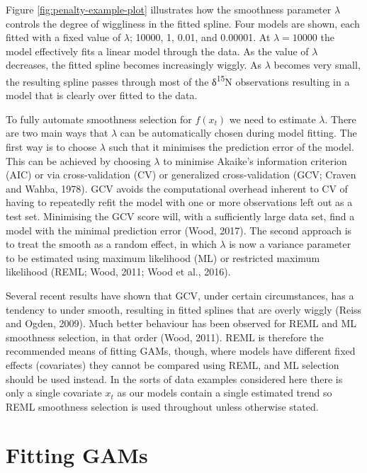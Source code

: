 \documentclass[12pt,]{article}
\begin{document}
Figure \ref{fig:penalty-example-plot} illustrates how the smoothness
parameter \(\lambda\) controls the degree of wiggliness in the fitted
spline. Four models are shown, each fitted with a fixed value of
\(\lambda\); 10000, 1, 0.01, and 0.00001. At \(\lambda = 10000\) the
model effectively fits a linear model through the data. As the value of
\(\lambda\) decreases, the fitted spline becomes increasingly wiggly. As
\(\lambda\) becomes very small, the resulting spline passes through most
of the δ\textsuperscript{15}N observations resulting in a model that is
clearly over fitted to the data.

To fully automate smoothness selection for \(f(x_t)\) we need to
estimate \(\lambda\). There are two main ways that \(\lambda\) can be
automatically chosen during model fitting. The first way is to choose
\(\lambda\) such that it minimises the prediction error of the model.
This can be achieved by choosing \(\lambda\) to minimise Akaike's
information criterion (AIC) or via cross-validation (CV) or generalized
cross-validation (GCV; Craven and Wahba, 1978). GCV avoids the
computational overhead inherent to CV of having to repeatedly refit the
model with one or more observations left out as a test set. Minimising
the GCV score will, with a sufficiently large data set, find a model
with the minimal prediction error (Wood, 2017). The second approach is
to treat the smooth as a random effect, in which \(\lambda\) is now a
variance parameter to be estimated using maximum likelihood (ML) or
restricted maximum likelihood (REML; Wood, 2011; Wood et al., 2016).

Several recent results have shown that GCV, under certain circumstances,
has a tendency to under smooth, resulting in fitted splines that are
overly wiggly (Reiss and Ogden, 2009). Much better behaviour has been
observed for REML and ML smoothness selection, in that order (Wood,
2011). REML is therefore the recommended means of fitting GAMs, though,
where models have different fixed effects (covariates) they cannot be
compared using REML, and ML selection should be used instead. In the
sorts of data examples considered here there is only a single covariate
\(x_t\) as our models contain a single estimated trend so REML
smoothness selection is used throughout unless otherwise stated.

\section{Fitting GAMs}\label{fitting-gams}
\end{document}
